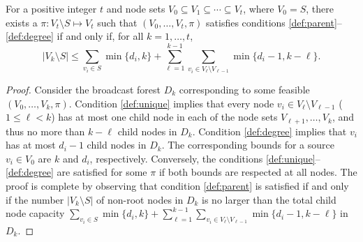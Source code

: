 \begin{lemma}
\label{lemma:degchild}
For a positive integer $t$ and node sets $V_0\subseteq V_1\subseteq\cdots\subseteq V_t$, where $V_0=S$,
there exists a $\pi:V_t\setminus S\mapsto V_t$ such that $\left(V_0,\ldots,V_t,\pi\right)$ satisfies 
conditions \ref{def:parent}--\ref{def:degree} if and only if, for all $k=1,\ldots,t$,
\begin{equation} \label{eq:lemiff}
\left|V_k\setminus S\right| \leq \sum_{v_i\in S}\min\{d_i, k\}+\sum_{\ell=1}^{k-1}\sum_{v_i\in V_{\ell}\setminus V_{\ell-1}}\min\{d_i-1, k-\ell\}.
\end{equation}
\end{lemma}
\begin{proof}
Consider the broadcast forest $D_k$ corresponding to some feasible $\left(V_0,\ldots,V_k,\pi\right)$.
Condition \ref{def:unique} implies that every node $v_i\in V_{\ell}\setminus V_{\ell-1}$ ($1\leq\ell<k$) has at most one child node in each of the node sets
$V_{\ell+1},\ldots,V_k$, and thus no more than $k-\ell$ child nodes in $D_k$.
Condition \ref{def:degree} implies that $v_i$ has at most $d_i-1$ child nodes in $D_k$.
The corresponding bounds for a source $v_i\in V_0$ are $k$ and $d_i$, respectively.
Conversely, the conditions \ref{def:unique}--\ref{def:degree} are satisfied for some $\pi$ if both bounds are respected at all nodes.
The proof is complete by observing that condition \ref{def:parent} is satisfied if and only if the number $\left|V_k\setminus S\right|$ of non-root nodes in $D_k$
is no larger than the total child node capacity $\sum_{v_i\in S}\min\{d_i, k\}+\sum_{\ell=1}^{k-1}\sum_{v_i\in V_{\ell}\setminus V_{\ell-1}}\min\{d_i-1, k-\ell\}$ in $D_k$.
\end{proof}

